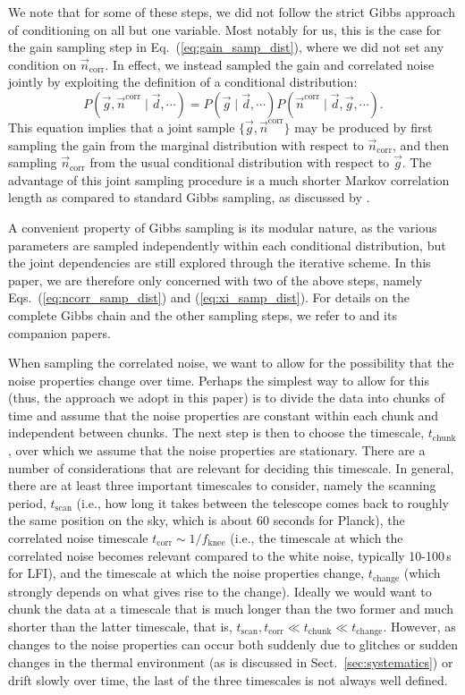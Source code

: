 \documentclass{aa}
\renewcommand{\d}[0]{\vec{d}}
\newcommand{\n}[0]{\vec{n}}
\newcommand{\g}[0]{\vec{g}}
\begin{document}
We note that for some of these steps, we did not follow the strict
Gibbs approach of conditioning on all but one variable. Most notably
for us, this is the case for the gain sampling step in
Eq.~(\ref{eq:gain_samp_dist}), where we did not set any condition on
$\n_\mathrm{corr}$. In effect, we instead sampled the gain and
correlated noise jointly by exploiting the definition of a conditional distribution:
\begin{equation}
        P(\g, \n^{\mathrm{corr}}\mid\d, \cdots) = P(\g\mid\d, \cdots)P(\n^{\mathrm{corr}}\mid\d,\g, \cdots).
\end{equation}
This equation implies that a joint sample $\{\g,\n^{\mathrm{corr}}\}$
may be produced by first sampling the gain from the marginal
distribution with respect to $\n_\mathrm{corr}$, and then sampling
$\n_\mathrm{corr}$ from the usual conditional distribution with
respect to $\g$. The advantage of this joint sampling procedure is a
much shorter Markov correlation length as compared to standard Gibbs
sampling, as discussed by \citet{bp07}.

A convenient property of Gibbs sampling is its modular nature, as the
various parameters are sampled independently within each conditional
distribution, but the joint dependencies are still explored through the
iterative scheme. In this paper, we are therefore only concerned with
two of the above steps, namely Eqs.~(\ref{eq:ncorr_samp_dist}) and
(\ref{eq:xi_samp_dist}). For details on the complete Gibbs chain and the
other sampling steps, we refer to \citet{bp01} and its companion papers.

When sampling the correlated noise, we want to allow for the possibility that the noise properties change over time. Perhaps the simplest way to allow for this (thus, the approach we adopt  in this paper) is to divide the data into chunks of time and assume that the noise properties are constant within each chunk and independent between chunks. The next step is then to choose the timescale, $t_\mathrm{chunk}$, over which we assume that the noise properties are stationary. There are a number of considerations that are relevant for deciding this timescale. In general, there are at least three important timescales to consider, namely the scanning period, $t_\mathrm{scan}$ (i.e., how long it takes between the telescope comes back to roughly the same position on the sky, which is about 60 seconds for Planck), the correlated noise timescale $t_\mathrm{corr} \sim 1/f_\mathrm{knee}$ (i.e., the timescale at which the correlated noise becomes relevant compared to the white noise, typically 10-100\,s for LFI), and the timescale at which the noise properties change, $t_\mathrm{change}$ (which strongly depends on what gives rise to the change). Ideally we would want to chunk the data at a timescale that is much longer than the two former and much shorter than the latter timescale, that is, $t_\mathrm{scan}, t_\mathrm{corr} \ll t_\mathrm{chunk} \ll t_\mathrm{change}$. However, as changes to the noise properties can occur both suddenly due to glitches or sudden changes in the thermal environment (as is discussed in Sect.~\ref{sec:systematics}) or drift slowly over time, the last of the three timescales is not always well defined.
\end{document}
